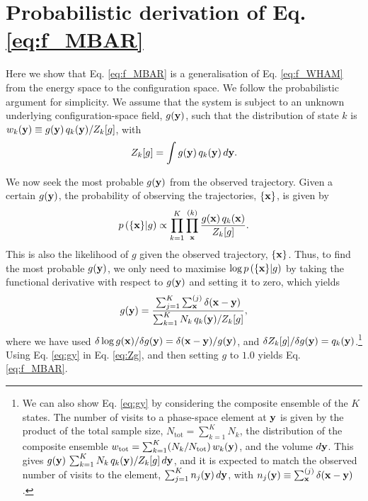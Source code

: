 \documentclass{gMOS2e}
\begin{document}
\appendices






\section{\label{sec:deriveMBAR}
Probabilistic derivation of Eq. \eqref{eq:f_MBAR}}



Here we show that
Eq. \eqref{eq:f_MBAR}
is a generalisation of Eq. \eqref{eq:f_WHAM}
from the energy space to the configuration space.
%
We follow the probabilistic argument\cite{
bartels1997, gallicchio2005, habeck2007, habeck2012, zhu2012}
for simplicity.
%
We assume that the system is subject to
an unknown underlying configuration-space field, $g(\mathbf{y})$,
such that the distribution of state $k$ is
$w_k(\mathbf{y}) \equiv g(\mathbf{y}) \, q_k(\mathbf{y}) / Z_k[g]$, with
%
\begin{equation}
Z_k[g]
=
\int g(\mathbf{y}) \, q_k(\mathbf{y}) \, d\mathbf{y}.
\label{eq:Zg}
\end{equation}



We now seek the most probable $g(\mathbf{y})$
from the observed trajectory.
%
Given a certain $g(\mathbf{y})$,
the probability of observing the trajectories,
$\{ \mathbf{x} \}$,
is given by
%
\begin{equation*}
p\left( \{ \mathbf{x} \} | g \right)
\propto
\prod_{k = 1}^K
\prod_{\mathbf{x}}^{(k)}
\frac{ g(\mathbf{x}) \, q_k(\mathbf{x}) }
     { Z_k[g] }.
\end{equation*}
%
%
This is also the likelihood of $g$
given the observed trajectory, $\{\mathbf{x}\}$.
%
Thus,
to find the most probable $g(\mathbf{y})$,
we only need to maximise
$\log p\left( \{ \mathbf{x} \} | g \right)$
by taking the functional derivative
with respect to $g(\mathbf{y})$
and setting it to zero,
which yields
%
\begin{equation}
g(\mathbf{y})
=
\frac{
  \sum_{j = 1}^K \sum_{\mathbf{x}}^{(j)} \delta(\mathbf{x} - \mathbf{y})
}
{
  \sum_{k = 1}^K N_k \, q_k(\mathbf{y}) / Z_k[g]
},
\label{eq:gy}
\end{equation}
%
where we have used
$\delta \log g(\mathbf{x}) / \delta g(\mathbf{y}) = \delta(\mathbf{x} - \mathbf{y})/g(\mathbf{y})$,
and
$\delta Z_k[g] / \delta g(\mathbf{y}) = q_k(\mathbf{y})$.\footnote{
We can also show Eq. \eqref{eq:gy}
by considering the composite ensemble of the $K$ states.
%
The number of visits to a phase-space element at $\mathbf{y}$
is given by the product of
%
the total sample size,
$N_\mathrm{tot} = \sum_{k = 1}^K N_k$,
the distribution of the composite ensemble
$w_\mathrm{tot} = \sum_{k = 1}^K (N_k/N_\mathrm{tot}) \, w_k(\mathbf{y})$,
and the volume $d\mathbf{y}$.
%
This gives
$g(\mathbf{y}) \, \sum_{k = 1}^K N_k \, q_k(\mathbf{y}) / Z_k[g] \, d\mathbf{y}$,
and it is expected to match the observed number of visits
to the element,
$\sum_{j = 1}^K n_j(\mathbf{y}) \, d\mathbf{y}$,
with $n_j(\mathbf{y}) \equiv \sum_{\mathbf{x}}^{(j)} \delta(\mathbf{x} - \mathbf{y})$.}
%
Using Eq. \eqref{eq:gy}
in Eq. \eqref{eq:Zg},
and then setting $g$ to $1.0$
yields Eq. \eqref{eq:f_MBAR}.
\end{document}
